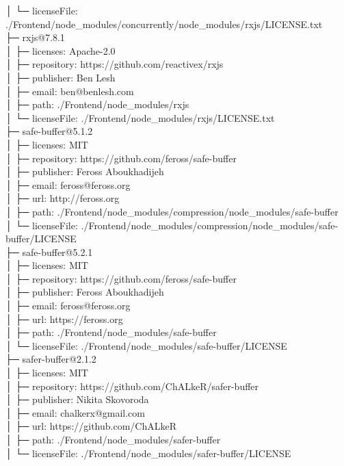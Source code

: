 │  └─ licenseFile: ./Frontend/node\_modules/concurrently/node\_modules/rxjs/LICENSE.txt\\
├─ rxjs@7.8.1\\
│  ├─ licenses: Apache-2.0\\
│  ├─ repository: https://github.com/reactivex/rxjs\\
│  ├─ publisher: Ben Lesh\\
│  ├─ email: ben@benlesh.com\\
│  ├─ path: ./Frontend/node\_modules/rxjs\\
│  └─ licenseFile: ./Frontend/node\_modules/rxjs/LICENSE.txt\\
├─ safe-buffer@5.1.2\\
│  ├─ licenses: MIT\\
│  ├─ repository: https://github.com/feross/safe-buffer\\
│  ├─ publisher: Feross Aboukhadijeh\\
│  ├─ email: feross@feross.org\\
│  ├─ url: http://feross.org\\
│  ├─ path: ./Frontend/node\_modules/compression/node\_modules/safe-buffer\\
│  └─ licenseFile: ./Frontend/node\_modules/compression/node\_modules/safe-buffer/LICENSE\\
├─ safe-buffer@5.2.1\\
│  ├─ licenses: MIT\\
│  ├─ repository: https://github.com/feross/safe-buffer\\
│  ├─ publisher: Feross Aboukhadijeh\\
│  ├─ email: feross@feross.org\\
│  ├─ url: https://feross.org\\
│  ├─ path: ./Frontend/node\_modules/safe-buffer\\
│  └─ licenseFile: ./Frontend/node\_modules/safe-buffer/LICENSE\\
├─ safer-buffer@2.1.2\\
│  ├─ licenses: MIT\\
│  ├─ repository: https://github.com/ChALkeR/safer-buffer\\
│  ├─ publisher: Nikita Skovoroda\\
│  ├─ email: chalkerx@gmail.com\\
│  ├─ url: https://github.com/ChALkeR\\
│  ├─ path: ./Frontend/node\_modules/safer-buffer\\
│  └─ licenseFile: ./Frontend/node\_modules/safer-buffer/LICENSE\\
